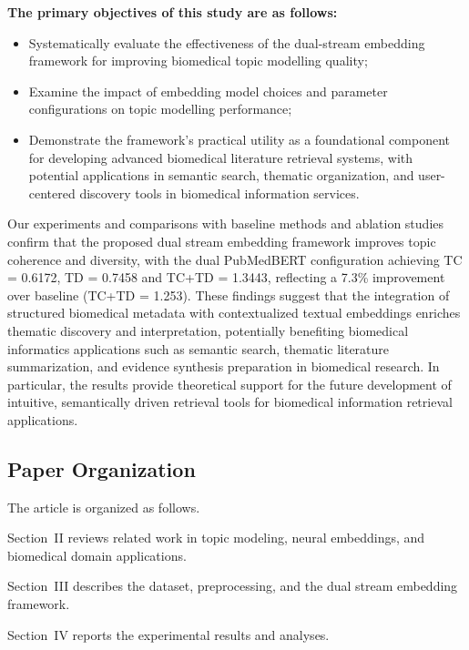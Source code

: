 \documentclass[utf8]{FrontiersinHarvard}
\begin{document}
\noindent\textbf{The primary objectives of this study are as follows:}
\begin{itemize}
\item Systematically evaluate the effectiveness of the dual-stream embedding framework for improving biomedical topic modelling quality;
\item Examine the impact of embedding model choices and parameter configurations on topic modelling performance;
\item Demonstrate the framework's practical utility as a foundational component for developing advanced biomedical literature retrieval systems, with potential applications in semantic search, thematic organization, and user-centered discovery tools in biomedical information services.
\end{itemize}
Our experiments and comparisons with baseline methods and ablation studies confirm that the proposed dual stream embedding framework improves topic coherence and diversity, with the dual PubMedBERT configuration achieving TC = 0.6172, TD = 0.7458 and TC+TD = 1.3443, reflecting a 7.3\% improvement over baseline (TC+TD = 1.253). These findings suggest that the integration of structured biomedical metadata with contextualized textual embeddings enriches thematic discovery and interpretation, potentially benefiting biomedical informatics applications such as semantic search, thematic literature summarization, and evidence synthesis preparation in biomedical research. In particular, the results provide theoretical support for the future development of intuitive, semantically driven retrieval tools for biomedical information retrieval applications.


\subsection{Paper Organization}

The article is organized as follows.

Section~II reviews related work in topic modeling, neural embeddings, and biomedical domain applications.

Section~III describes the dataset, preprocessing, and the dual stream embedding framework.

Section~IV reports the experimental results and analyses.
\end{document}
